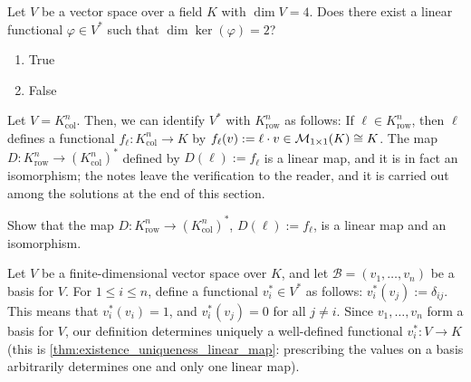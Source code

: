 \begin{exercise}
\label{exc:dim_kernel_linear_functional_sc}
Let $V$ be a vector space over a field $K$ with $\dim V = 4$. Does there exist a linear functional $\varphi \in V^*$ such that $\dim \ker(\varphi) = 2$?
\begin{enumerate}
    \item True
    \item False
\end{enumerate}
\end{exercise}

Let $V = K_{\text{col}}^n$. Then, we can identify $V^*$ with $K_{\text{row}}^n$ as follows: If $\ell \in K_{\text{row}}^n$, then $\ell$ defines a functional $f_{\ell} \colon K_{\text{col}}^n \to K$ by $f_{\ell}(v) := \ell \cdot v \in \mathcal{M}_{1 \times 1}(K) \cong K$. %
The map $D \colon K_{\text{row}}^n \to (K_{\text{col}}^n)^*$ defined by $D(\ell) := f_{\ell}$ is a linear map, and it is in fact an isomorphism; the notes leave the verification to the reader, and it is carried out among the solutions at the end of this section.

\begin{exercise}
\label{exc:row_space_is_dual}
Show that the map $D \colon K_{\text{row}}^n \to (K_{\text{col}}^n)^*$, $D(\ell) := f_{\ell}$, is a linear map and an isomorphism.
\end{exercise}


\begin{definition*}
\label{def:dual_basis_functionals}
Let $V$ be a finite-dimensional vector space over $K$, and let $\mathcal{B} = (v_1, \dots, v_n)$ be a basis for $V$. For $1 \leq i \leq n$, define a functional $v_i^* \in V^*$ as follows: $v_i^*(v_j) := \delta_{ij}$. This means that $v_i^*(v_i) = 1$, and $v_i^*(v_j) = 0$ for all $j \neq i$. Since $v_1, \dots, v_n$ form a basis for $V$, our definition determines uniquely a well-defined functional $v_i^* \colon V \to K$
(this is \cref{thm:existence_uniqueness_linear_map}: prescribing the values on a basis arbitrarily determines one and only one linear map).
\end{definition*}

